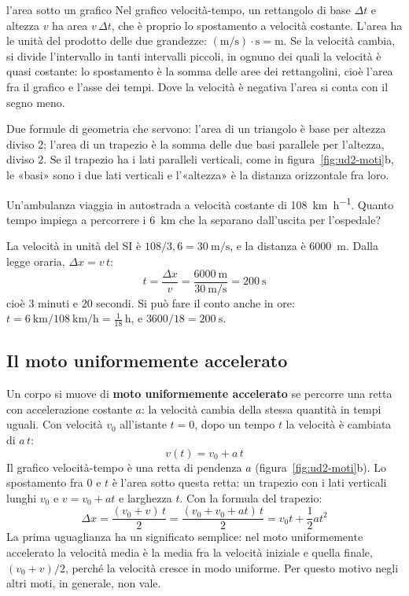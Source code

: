 \begin{richiamo}{l'area sotto un grafico}
Nel grafico velocità-tempo, un rettangolo di base $\Delta t$ e altezza $v$ ha area $v\,\Delta t$, che è proprio lo spostamento a velocità costante. L'area ha le unità del prodotto delle due grandezze: $(\si{\metre\per\second}) \cdot \si{\second} = \si{\metre}$. Se la velocità cambia, si divide l'intervallo in tanti intervalli piccoli, in ognuno dei quali la velocità è quasi costante: lo spostamento è la somma delle aree dei rettangolini, cioè l'area fra il grafico e l'asse dei tempi. Dove la velocità è negativa l'area si conta con il segno meno.

Due formule di geometria che servono: l'area di un triangolo è base per altezza diviso 2; l'area di un trapezio è la somma delle due basi parallele per l'altezza, diviso 2. Se il trapezio ha i lati paralleli verticali, come in figura~\ref{fig:ud2-moti}b, le «basi» sono i due lati verticali e l'«altezza» è la distanza orizzontale fra loro.
\end{richiamo}

\begin{esempio}
Un'ambulanza viaggia in autostrada a velocità costante di \SI{108}{\kilo\metre\per\hour}. Quanto tempo impiega a percorrere i \SI{6}{\kilo\metre} che la separano dall'uscita per l'ospedale?

La velocità in unità del SI è $108/3{,}6 = \SI{30}{\metre\per\second}$, e la distanza è \SI{6000}{\metre}. Dalla legge oraria, $\Delta x = v\,t$:
\[
  t = \frac{\Delta x}{v} = \frac{\SI{6000}{\metre}}{\SI{30}{\metre\per\second}} = \SI{200}{\second}
\]
cioè 3 minuti e 20 secondi. Si può fare il conto anche in ore: $t = \SI{6}{\kilo\metre} / \SI{108}{\kilo\metre\per\hour} = \frac{1}{18}\,\si{\hour}$, e $3600/18 = \SI{200}{\second}$.
\end{esempio}

\subsection{Il moto uniformemente accelerato}

Un corpo si muove di \textbf{moto uniformemente accelerato} se percorre una retta con accelerazione costante $a$: la velocità cambia della stessa quantità in tempi uguali. Con velocità $v_0$ all'istante $t = 0$, dopo un tempo $t$ la velocità è cambiata di $a\,t$:
\[
  v(t) = v_0 + a\,t
\]
Il grafico velocità-tempo è una retta di pendenza $a$ (figura~\ref{fig:ud2-moti}b). Lo spostamento fra 0 e $t$ è l'area sotto questa retta: un trapezio con i lati verticali lunghi $v_0$ e $v = v_0 + at$ e larghezza $t$. Con la formula del trapezio:
\[
  \Delta x = \frac{(v_0 + v)\,t}{2} = \frac{(v_0 + v_0 + at)\,t}{2} = v_0 t + \frac{1}{2}a t^2
\]
La prima uguaglianza ha un significato semplice: nel moto uniformemente accelerato la velocità media è la media fra la velocità iniziale e quella finale, $(v_0 + v)/2$, perché la velocità cresce in modo uniforme. Per questo motivo negli altri moti, in generale, non vale.

